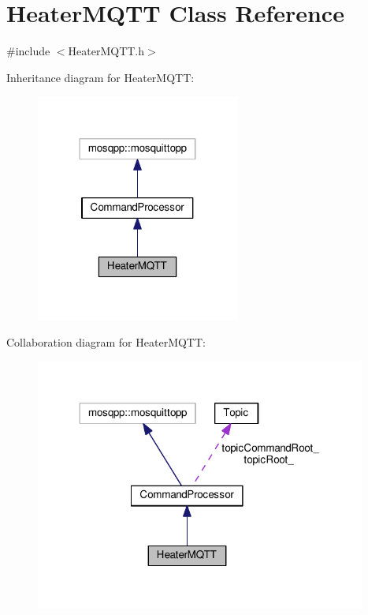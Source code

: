 \hypertarget{class_heater_m_q_t_t}{}\section{Heater\+M\+Q\+TT Class Reference}
\label{class_heater_m_q_t_t}


{\ttfamily \#include $<$Heater\+M\+Q\+T\+T.\+h$>$}



Inheritance diagram for Heater\+M\+Q\+TT\+:\nopagebreak
\begin{figure}[H]
\begin{center}
\leavevmode
\includegraphics[width=190pt]{class_heater_m_q_t_t__inherit__graph}
\end{center}
\end{figure}


Collaboration diagram for Heater\+M\+Q\+TT\+:\nopagebreak
\begin{figure}[H]
\begin{center}
\leavevmode
\includegraphics[width=308pt]{class_heater_m_q_t_t__coll__graph}
\end{center}
\end{figure}
